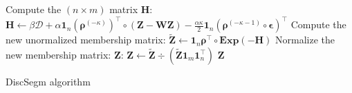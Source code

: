 \documentclass[11p]{article}
\begin{document}
\begin{algorithm}[H]
{		Compute the $(n \times m)$ matrix $\mathbf{H}$: $\mathbf{H} \leftarrow \beta \bm{\mathcal{D}} + \alpha \mathbf{1}_n (\bm{\rho}^{(-\kappa)})^\top \circ (\mathbf{Z} - \mathbf{W}\mathbf{Z}) - \frac{\alpha \kappa}{2} \mathbf{1}_n (\bm{\rho}^{(-\kappa-1)} \circ \bm{\epsilon})^\top$\;
		Compute the new unormalized membership matrix: $\widetilde{\mathbf{Z}} \leftarrow \mathbf{1}_n \bm{\rho}^\top \circ \mathbf{Exp}(\mathbf{-H})$\;
		Normalize the new membership matrix: $\mathbf{Z}$: $\mathbf{Z} \leftarrow \widetilde{\mathbf{Z}} \div (\widetilde{\mathbf{Z}} \mathbf{1}_m \mathbf{1}_n^\top)$\; 
	}
	\Return $\mathbf{Z}$\;
	\caption{DiscSegm algorithm}
\end{algorithm}


\begin{algorithm}[H]
	\SetAlgoLined
	

\end{algorithm}
\end{document}
